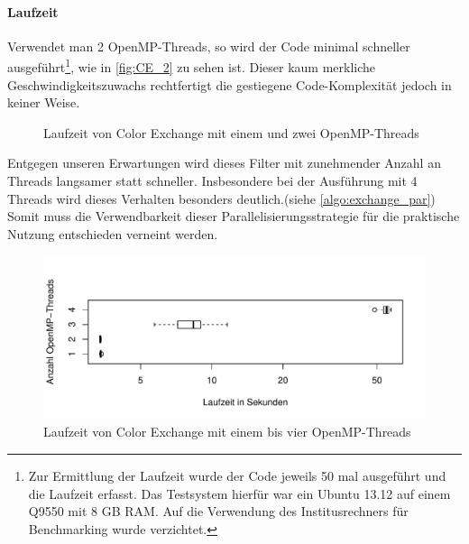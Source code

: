 \documentclass[10pt,a4paper]{article}
\begin{document}
\paragraph{Laufzeit}
Verwendet man 2 OpenMP-Threads, so wird der Code minimal schneller ausgeführt\footnote{Zur Ermittlung der Laufzeit wurde der Code jeweils 50 mal ausgeführt und die Laufzeit erfasst. Das Testsystem hierfür war ein Ubuntu 13.12 auf einem Q9550 mit 8 GB RAM. Auf die Verwendung des Institusrechners für Benchmarking wurde verzichtet.}, wie in \autoref{fig:CE_2} zu sehen ist. Dieser kaum merkliche Geschwindigkeitszuwachs rechtfertigt die gestiegene Code-Komplexität jedoch in keiner Weise.

\begin{figure}[hb]
\centering
\caption{Laufzeit von Color Exchange mit einem und zwei OpenMP-Threads}
\label{fig:CE_2}
\end{figure}
Entgegen unseren Erwartungen wird dieses Filter mit zunehmender Anzahl an Threads langsamer statt schneller. Insbesondere bei der Ausführung mit 4 Threads wird dieses Verhalten besonders deutlich.(siehe \autoref{algo:exchange_par}) Somit muss die Verwendbarkeit dieser Parallelisierungsstrategie für die praktische Nutzung entschieden verneint werden.

\begin{figure}[hb]
\centering
\includegraphics[scale=0.7]{diag.pdf}
\caption{Laufzeit von Color Exchange mit einem bis vier OpenMP-Threads}
\end{figure}
\end{document}
